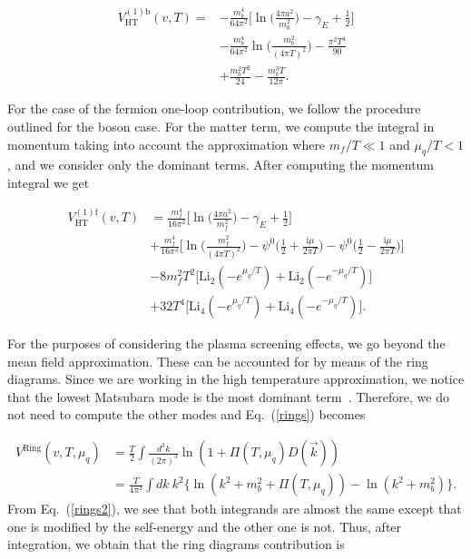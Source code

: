 \documentclass[%
 reprint,
showpacs,preprintnumbers,
 amsmath,amssymb,
onecolumn]{revtex4}
\begin{document}
\begin{align}
    V_{\text{HT}}^{(1)\text{b}}(v,T)=&-\frac{m_b^4}{64\pi^2}\Big[ \ln \Big( \frac{4\pi a^2}{m_b^2}\Big)-\gamma_E+\frac{1}{2} \Big]\nonumber \\
    &-\frac{m_b^4}{64\pi^2}\ln \Big( \frac{m_b^2}{(4\pi T)^2}\Big)-\frac{\pi^2 T^4}{90}\nonumber \\
    &+\frac{m_b^2 T^2}{24}-\frac{m_b^3 T}{12\pi}.
    \label{final1loopb}
\end{align}

For the case of the fermion one-loop contribution, we follow the procedure outlined for the boson case. For the matter term, we compute the integral in momentum taking into account the approximation where $m_f/T\ll 1$ and $\mu_q/T<1$, and we consider only the dominant terms. After computing the momentum integral we get

\begin{align}
    V_{\text{HT}}^{(1)\text{f}}(v,T)&=\frac{m_f^4}{16\pi^2}\Big[ \ln \Big( \frac{4\pi a^2}{m_f^2}\Big)-\gamma_E+\frac{1}{2} \Big]\nonumber \\
    &+\frac{m_f^4}{16\pi^2}\Big[\ln \Big( \frac{m_f^2}{(4\pi T)^2}\Big)
    -\psi^0\Big( \frac{1}{2}+\frac{\text{i}\mu}{2\pi T} \Big)-\psi^0\Big( \frac{1}{2}-\frac{\text{i}\mu}{2\pi T} \Big)\Big]\nonumber \\
    &-8m_f^2T^2\Big[ \text{Li}_2(-e^{\mu_q/T}) +\text{Li}_2(-e^{-\mu_q/T}) \Big]\nonumber \\
    &+32T^4\Big[ \text{Li}_4(-e^{\mu_q/T}) +\text{Li}_4(-e^{-\mu_q/T}) \Big].
    \label{final1loopf}
\end{align}

For the purposes of considering the plasma screening effects, we go beyond the mean field approximation. These can be accounted for by means of the ring diagrams. Since we are working in the high temperature approximation, we notice that the lowest Matsubara mode is the most dominant term~\cite{LeBellac}. Therefore, we do not need to compute the other modes and Eq.~(\ref{rings}) becomes

\begin{align}
    V^{\text{Ring}}(v,T,\mu_q)&=\frac{T}{2}\int\frac{d^3k}{(2\pi)^3}\ln (1+\Pi(T,\mu_q)D(\vec{k}))\nonumber \\
    &=\frac{T}{4\pi^2}\int dk \ k^2 \Big \{ \ln(k^2+m_b^2+\Pi(T,\mu_q)) -\ln(k^2+m_b^2) \Big\}.
    \label{rings2}    
\end{align}
From Eq.~(\ref{rings2}), we see that both integrands are almost the same except that one is modified by the self-energy and the other one is not. Thus, after integration, we obtain that the ring diagrams contribution is
\end{document}
